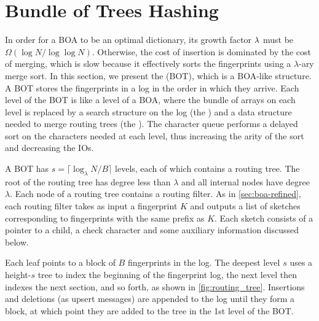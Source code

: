 \section{Bundle of Trees Hashing}\label{sec:boa-bot}

In order for a BOA to be an optimal dictionary, its growth factor $\lambda{}$
must be $\Omega(\log{N}/\log\log{N})$. Otherwise, the cost of insertion is
dominated by the cost of merging, which is slow because it effectively sorts
the fingerprints using a $\lambda$-ary merge sort. In this section, we present
the  (BOT), which is a BOA-like structure. A
BOT stores the fingerprints in a log in the order in which they arrive. Each
level of the BOT is like a level of a BOA, where the bundle of arrays on each
level is replaced by a search structure on the log (the )
and a data structure needed to merge routing trees (the ).  The character queue performs a delayed sort on the characters needed
at each level, thus increasing the arity of the sort and decreasing the IOs.

A BOT has $s = \lceil \log_\lambda N/B \rceil$ levels, each of which contains a
routing tree. The root of the routing tree has degree less than $\lambda$ and
all internal nodes have degree $\lambda$. Each node of a routing tree contains
a routing filter. As in \cref{sec:boa-refined}, each routing filter takes as
input a fingerprint $K$ and outputs a list of sketches corresponding to
fingerprints with the same prefix as $K$. Each sketch consists of a pointer to
a child, a check character and some auxiliary information discussed below.

Each leaf points to a block of $B$ fingerprints in the log. The deepest level
$s$ uses a height-$s$ tree to index the beginning of the fingerprint log, the
next level then indexes the next section, and so forth, as shown in
\cref{fig:routing_tree}. Insertions and deletions (as upsert messages) are
appended to the log until they form a block, at which point they are added to
the tree in the 1st level of the BOT.

